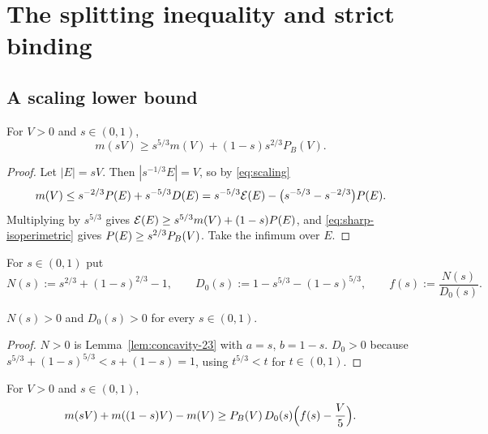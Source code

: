 \chapter{The splitting inequality and strict binding}\label{ch:binding-ineq}

\section{A scaling lower bound}

\begin{lemma}\label{lem:scaling-lower}
For $V>0$ and $s\in(0,1)$,
\begin{equation}\label{eq:scaling-lower}
  m(sV)\ge s^{5/3}m(V)+(1-s)s^{2/3}P_B(V).
\end{equation}
\end{lemma}

\begin{proof}
Let $|E|=sV$.  Then $|s^{-1/3}E|=V$, so by \eqref{eq:scaling}
\[
  m(V)\le s^{-2/3}P(E)+s^{-5/3}D(E)
  =s^{-5/3}\mathcal E(E)-\bigl(s^{-5/3}-s^{-2/3}\bigr)P(E).
\]
Multiplying by $s^{5/3}$ gives
$\mathcal E(E)\ge s^{5/3}m(V)+(1-s)P(E)$, and
\eqref{eq:sharp-isoperimetric} gives $P(E)\ge s^{2/3}P_B(V)$.  Take the
infimum over $E$.
\end{proof}

\begin{definition}\label{def:splitting-functions}
For $s\in(0,1)$ put
\[
  N(s):=s^{2/3}+(1-s)^{2/3}-1,
  \qquad
  D_0(s):=1-s^{5/3}-(1-s)^{5/3},
  \qquad
  f(s):=\frac{N(s)}{D_0(s)} .
\]
\end{definition}

\begin{lemma}[Positivity]\label{lem:ND-positive}
$N(s)>0$ and $D_0(s)>0$ for every $s\in(0,1)$.
\end{lemma}

\begin{proof}
$N>0$ is Lemma~\ref{lem:concavity-23} with $a=s$, $b=1-s$.  $D_0>0$ because
$s^{5/3}+(1-s)^{5/3}<s+(1-s)=1$, using $t^{5/3}<t$ for $t\in(0,1)$.
\end{proof}

\begin{lemma}\label{lem:two-piece}
For $V>0$ and $s\in(0,1)$,
\begin{equation}\label{eq:two-piece}
  m(sV)+m((1-s)V)-m(V)
  \ge P_B(V)\,D_0(s)\Bigl(f(s)-\frac V5\Bigr).
\end{equation}
\end{lemma}

